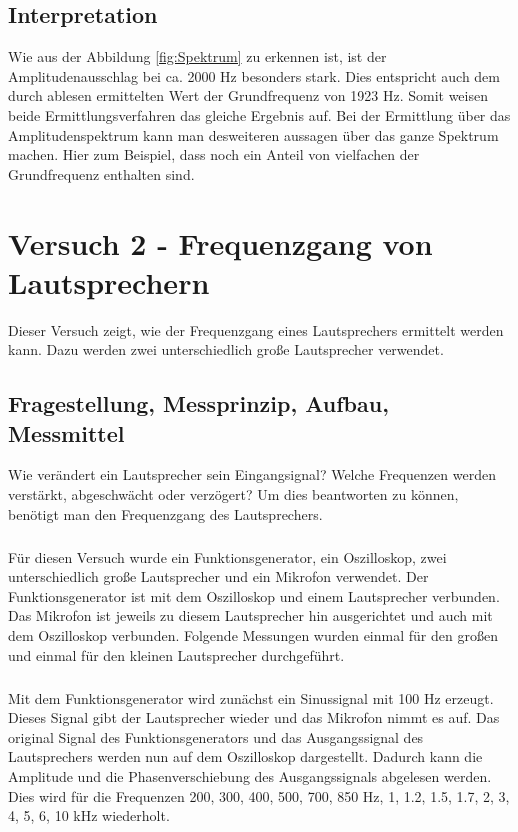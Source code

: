 \documentclass[12pt,oneside,a4paper]{report}
\begin{document}
\section{Interpretation}
\label{chap:VERSUCH_1_INTERPRETATION}
Wie aus der Abbildung \ref{fig:Spektrum} zu erkennen ist, ist der Amplitudenausschlag bei ca. 2000 Hz besonders stark. Dies entspricht auch dem durch ablesen ermittelten Wert der Grundfrequenz von 1923 Hz. Somit weisen beide Ermittlungsverfahren das gleiche Ergebnis auf. Bei der Ermittlung über das Amplitudenspektrum kann man desweiteren aussagen über das ganze Spektrum machen. Hier zum Beispiel, dass noch ein Anteil von vielfachen der Grundfrequenz enthalten sind.

%
%
\chapter{Versuch 2 - Frequenzgang von Lautsprechern}
\label{chap:VERSUCH_2}

Dieser Versuch zeigt, wie der Frequenzgang eines Lautsprechers ermittelt werden kann.
Dazu werden zwei unterschiedlich große Lautsprecher verwendet.

\section{Fragestellung, Messprinzip, Aufbau, Messmittel}
\label{chap:VERSUCH_2_FRAGESTELLUNG}

Wie verändert ein Lautsprecher sein Eingangsignal? Welche Frequenzen werden verstärkt, abgeschwächt oder verzögert?
Um dies beantworten zu können, benötigt man den Frequenzgang des Lautsprechers.
\paragraph{}
Für diesen Versuch wurde ein Funktionsgenerator, ein Oszilloskop, zwei unterschiedlich große Lautsprecher und ein Mikrofon verwendet.
Der Funktionsgenerator ist mit dem Oszilloskop und einem Lautsprecher verbunden. Das Mikrofon ist jeweils zu diesem Lautsprecher hin ausgerichtet und auch mit dem Oszilloskop verbunden. Folgende Messungen wurden einmal für den großen und einmal für den kleinen Lautsprecher durchgeführt.
\paragraph{}
Mit dem Funktionsgenerator wird zunächst ein Sinussignal mit 100 Hz erzeugt.
Dieses Signal gibt der Lautsprecher wieder und das Mikrofon nimmt es auf.
Das original Signal des Funktionsgenerators und das Ausgangssignal des Lautsprechers werden nun auf dem Oszilloskop dargestellt.
Dadurch kann die Amplitude und die Phasenverschiebung des Ausgangssignals abgelesen werden.
Dies wird für die Frequenzen 200, 300, 400, 500, 700, 850 Hz, 1, 1.2, 1.5, 1.7, 2, 3, 4, 5, 6, 10 kHz wiederholt.
\end{document}
